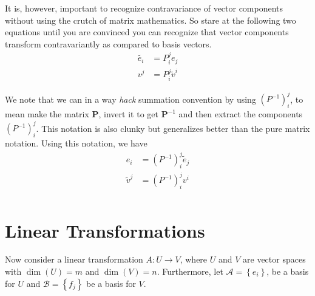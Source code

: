 \documentclass[a4paper]{article}
\begin{document}
It is, however, important to recognize contravariance of vector components without using the crutch of matrix mathematics. So stare at the following two equations until you are convinced you can recognize that vector components transform contravariantly as compared to basis vectors.
\[
  \begin{aligned}
    \tilde{e_i} &= P_i^j e_j \\
    v^j &= P_i^j \tilde{v}^i
  \end{aligned}
\]

We note that we can in a way \textit{hack} summation convention by using $(P^{-1})^j_i$, to mean make the matrix $\bm{P}$, invert it to get $\bm{P}^{-1}$ and then extract the components $(P^{-1})^j_i$. This notation is also clunky but generalizes better than the pure matrix notation. Using this notation, we have
\[
  \begin{aligned}
    e_i &= (P^{-1})_i^j \tilde{e}_j \\
    \tilde{v}^j &= (P^{-1})_i^j v^i \\
  \end{aligned}
\]

\section*{Linear Transformations}%
Now consider a linear transformation $A: U \rightarrow V$, where $U$ and $V$ are vector spaces with $\dim(U) = m$ and $\dim(V) = n$. Furthermore, let $ \mathcal{A} = \left\{ e_i \right\}$, be a basis for $U$ and $\mathcal{B} = \left\{ f_j \right\}$ be a basis for $V$. 
\end{document}
